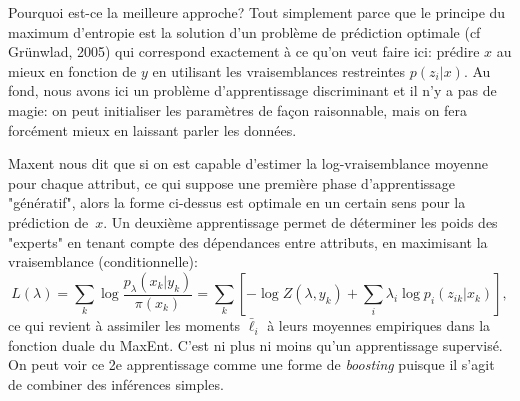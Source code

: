 \documentclass{article}
\begin{document}
Pourquoi est-ce la meilleure approche? Tout simplement parce que le principe du maximum d'entropie est la solution d'un probl\`eme de pr\'ediction optimale (cf Gr\"unwlad, 2005) qui correspond exactement \`a ce qu'on veut faire ici: pr\'edire $x$ au mieux en fonction de $y$ en utilisant les vraisemblances restreintes $p(z_i|x)$. Au fond, nous avons ici un probl\`eme d'apprentissage discriminant et il n'y a pas de magie: on peut initialiser les param\`etres de fa\c con raisonnable, mais on fera forc\'ement mieux en laissant parler les donn\'ees.

Maxent nous dit que si on est capable d'estimer la log-vraisemblance moyenne pour chaque attribut, ce qui suppose une premi\`ere phase d'apprentissage "g\'en\'eratif", alors la forme ci-dessus est optimale en un certain sens pour la pr\'ediction de~$x$. Un deuxi\`eme apprentissage permet de d\'eterminer les poids des "experts" en tenant compte des d\'ependances entre attributs, en maximisant la vraisemblance (conditionnelle):  
$$
L(\lambda) 
= \sum_k \log \frac{p_\lambda(x_k|y_k)}{\pi(x_k)}
= \sum_k \left[
-\log Z(\lambda, y_k) + \sum_i \lambda_i \log p_i(z_{ik}|x_k)
\right],
$$
ce qui revient \`a assimiler les moments $\bar{\ell}_i$ \`a leurs moyennes empiriques dans la fonction duale du MaxEnt. C'est ni plus ni moins qu'un apprentissage supervis\'e. On peut voir ce 2e apprentissage comme une forme de {\em boosting} puisque il s'agit de combiner des inf\'erences simples.
\end{document}
